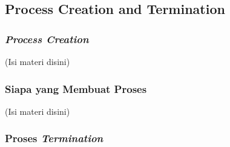 \documentclass[12pt]{article}
\begin{document}
\subsection{Process Creation and Termination}
\subsubsection{\textit{Process Creation}}
(Isi materi disini)

\subsubsection{Siapa yang Membuat Proses}
(Isi materi disini)

\subsubsection{Proses \textit{Termination}}
\end{document}
